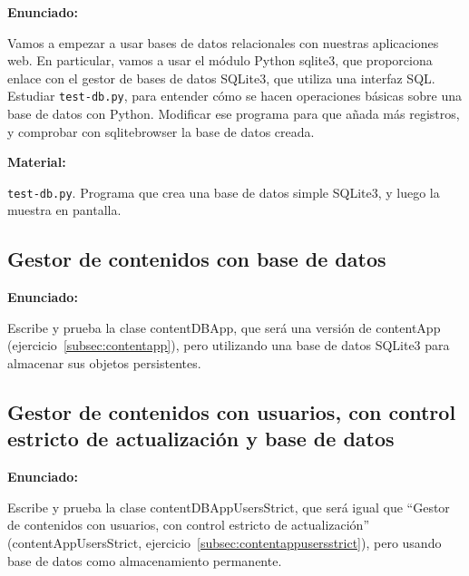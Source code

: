 \textbf{Enunciado:}

Vamos a empezar a usar bases de datos relacionales con nuestras aplicaciones web. En particular, vamos a usar el módulo Python sqlite3, que proporciona enlace con el gestor de bases de datos SQLite3, que utiliza una interfaz SQL. Estudiar \texttt{test-db.py}, para entender cómo se hacen operaciones básicas sobre una base de datos con Python. Modificar ese programa para que añada más registros, y comprobar con sqlitebrowser la base de datos creada.

\textbf{Material:}

\texttt{test-db.py}. Programa que crea una base de datos simple SQLite3, y luego la muestra en pantalla.

\subsection{Gestor de contenidos con base de datos}
\label{subsec:gestor-contenidos-bbdd}

\textbf{Enunciado:}

Escribe y prueba la clase contentDBApp, que será una versión de contentApp (ejercicio~\ref{subsec:contentapp}), pero utilizando una base de datos SQLite3 para almacenar sus objetos persistentes.

\subsection{Gestor de contenidos con usuarios, con control estricto de actualización y base de datos}
\label{subsec:gestor-contenidos-usuarios-bbdd}

\textbf{Enunciado:}

Escribe y prueba la clase contentDBAppUsersStrict, que será igual que ``Gestor de contenidos con usuarios, con control estricto de actualización'' (contentAppUsersStrict, ejercicio~\ref{subsec:contentappusersstrict}), pero usando base de datos como almacenamiento permanente.


\newpage




